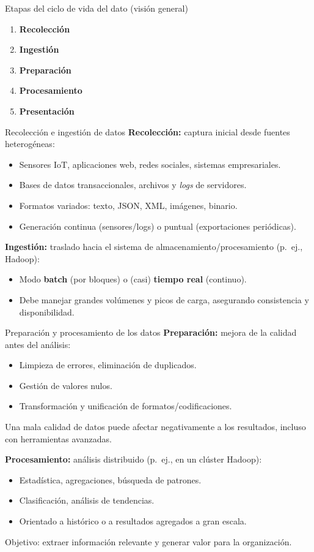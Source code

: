 \documentclass{beamer}
\begin{document}
\begin{frame}{Etapas del ciclo de vida del dato (visión general)}
\begin{enumerate}
    \item \textbf{Recolección}
    \item \textbf{Ingestión}
    \item \textbf{Preparación}
    \item \textbf{Procesamiento}
    \item \textbf{Presentación}
\end{enumerate}
\end{frame}

\begin{frame}{Recolección e ingestión de datos}
\textbf{Recolección:} captura inicial desde fuentes heterogéneas:
\begin{itemize}
    \item Sensores IoT, aplicaciones web, redes sociales, sistemas empresariales.
    \item Bases de datos transaccionales, archivos y \textit{logs} de servidores.
    \item Formatos variados: texto, JSON, XML, imágenes, binario.
    \item Generación continua (sensores/logs) o puntual (exportaciones periódicas).
\end{itemize}

\medskip
\textbf{Ingestión:} traslado hacia el sistema de almacenamiento/procesamiento (p.\ ej., Hadoop):
\begin{itemize}
    \item Modo \textbf{batch} (por bloques) o (casi) \textbf{tiempo real} (continuo).
    \item Debe manejar grandes volúmenes y picos de carga, asegurando consistencia y disponibilidad.
\end{itemize}
\end{frame}

\begin{frame}{Preparación y procesamiento de los datos}
\textbf{Preparación:} mejora de la calidad antes del análisis:
\begin{itemize}
    \item Limpieza de errores, eliminación de duplicados.
    \item Gestión de valores nulos.
    \item Transformación y unificación de formatos/codificaciones.
\end{itemize}
Una mala calidad de datos puede afectar negativamente a los resultados, incluso con herramientas avanzadas.

\medskip
\textbf{Procesamiento:} análisis distribuido (p.\ ej., en un clúster Hadoop):
\begin{itemize}
    \item Estadística, agregaciones, búsqueda de patrones.
    \item Clasificación, análisis de tendencias.
    \item Orientado a histórico o a resultados agregados a gran escala.
\end{itemize}
Objetivo: extraer información relevante y generar valor para la organización.
\end{frame}
\end{document}
